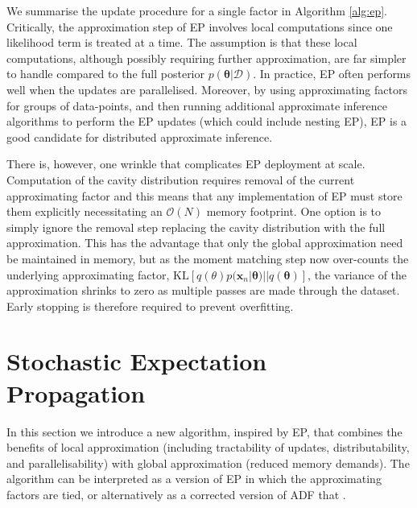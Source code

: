 We summarise the update procedure for a single factor in Algorithm \ref{alg:ep}. Critically, the approximation step of EP involves local computations since one likelihood term is treated at a time. The assumption is that these local computations, although possibly requiring further approximation, are far simpler to handle compared to the full posterior $p(\bm{\theta}| \mathcal{D})$. In practice, EP often performs well when the updates are parallelised. Moreover, by using approximating factors for groups of data-points, and then running additional approximate inference algorithms to perform the EP updates (which could include nesting EP), EP is a good candidate for distributed approximate inference.

There is, however, one wrinkle that complicates EP deployment at scale. Computation of the cavity distribution requires removal of the current approximating factor and this means that any implementation of EP must store them explicitly necessitating an $\mathcal{O}(N)$ memory footprint. One option is to simply ignore the removal step replacing the cavity distribution with the full approximation. This has the advantage that only the global approximation need be maintained in memory, but as the moment matching step now over-counts the underlying approximating factor, $\mathrm{KL}[q(\theta) p(\bm{x}_n | \bm{\theta}) || q(\bm{\theta})]$, the variance of the approximation shrinks to zero as multiple passes are made through the dataset. Early stopping is therefore required to prevent overfitting.

\section{Stochastic Expectation Propagation}
%
In this section we introduce a new algorithm, inspired by EP, that combines the benefits of local approximation (including tractability of updates, distributability, and parallelisability) with global approximation (reduced memory demands). The algorithm can be interpreted as a version of EP in which the approximating factors are tied, or alternatively as a corrected version of ADF that . 

